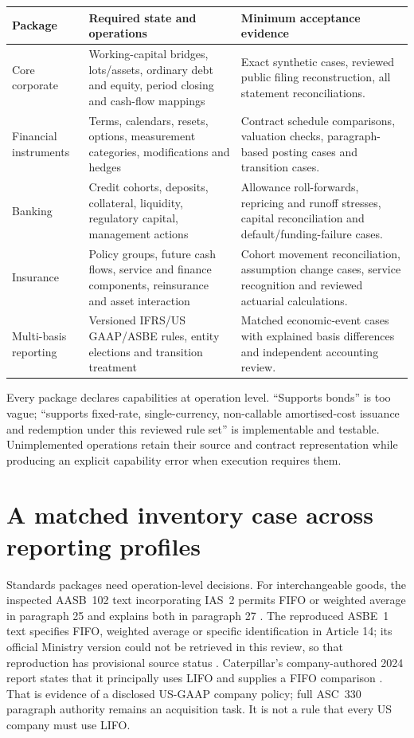 \begin{longtable}{L{26mm}L{55mm}L{55mm}}
\toprule Package & Required state and operations & Minimum acceptance evidence\\\midrule\endhead
Core corporate & Working-capital bridges, lots/assets, ordinary debt and equity,
period closing and cash-flow mappings & Exact synthetic cases, reviewed public
filing reconstruction, all statement reconciliations.\\
Financial instruments & Terms, calendars, resets, options, measurement
categories, modifications and hedges & Contract schedule comparisons, valuation
checks, paragraph-based posting cases and transition cases.\\
Banking & Credit cohorts, deposits, collateral, liquidity, regulatory capital,
management actions & Allowance roll-forwards, repricing and runoff stresses,
capital reconciliation and default/funding-failure cases.\\
Insurance & Policy groups, future cash flows, service and finance components,
reinsurance and asset interaction & Cohort movement reconciliation, assumption
change cases, service recognition and reviewed actuarial calculations.\\
Multi-basis reporting & Versioned IFRS/US GAAP/ASBE rules, entity elections and
transition treatment & Matched economic-event cases with explained basis
differences and independent accounting review.\\\bottomrule
\end{longtable}

Every package declares capabilities at operation level. ``Supports bonds'' is
too vague; ``supports fixed-rate, single-currency, non-callable amortised-cost
issuance and redemption under this reviewed rule set'' is implementable and
testable. Unimplemented operations retain their source and contract
representation while producing an explicit capability error when execution
requires them.

\section{A matched inventory case across reporting profiles}

Standards packages need operation-level decisions. For interchangeable goods,
the inspected AASB~102 text incorporating IAS~2 permits FIFO or weighted
average in paragraph 25 and explains both in paragraph 27
\citep{aasb102}. The reproduced ASBE~1 text specifies FIFO, weighted average
or specific identification in Article 14; its official Ministry version could
not be retrieved in this review, so that reproduction has provisional source
status \citep{asbe1copy}. Caterpillar's company-authored 2024 report states
that it principally uses LIFO and supplies a FIFO comparison
\citep[Note 1.C]{caterpillar2024}. That is evidence of a disclosed US-GAAP
company policy; full ASC~330 paragraph authority remains an acquisition task.
It is not a rule that every US company must use LIFO.

